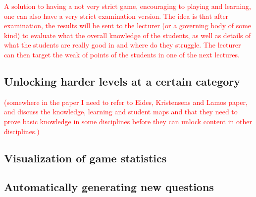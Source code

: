\documentclass[a4paper,12pt]{book}
\begin{document}



\textcolor{red}{A solution to having a not very strict game, encouraging to playing and learning, one can also have a very strict examination version. The idea is that after examination, the results will be sent to the lecturer (or a governing body of some kind) to evaluate what the overall knowledge of the students, as well as details of what the students are really good in and where do they struggle. The lecturer can then target the weak of points of the students in one of the next lectures. }


\subsection{Unlocking harder levels at a certain category}
\textcolor{red}{(somewhere in the paper I need to refer to Eides, Kristensens and Lamos paper, and discuss the knowledge, learning and student maps and that they need to prove basic knowledge in some disciplines before they can unlock content in other disciplines.)}
\subsection{Visualization of game statistics}
\subsection{Automatically generating new questions}
\end{document}
